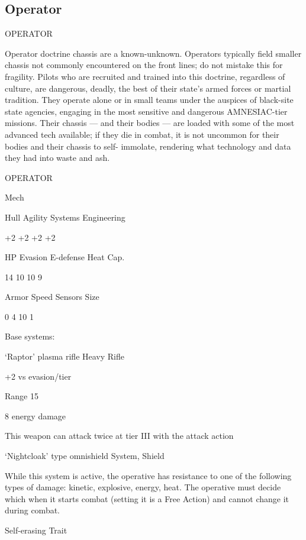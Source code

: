 \subsection{Operator}

                                              OPERATOR  

Operator doctrine chassis are a known-unknown. Operators typically field smaller chassis not  
commonly encountered on the front lines; do not mistake this for fragility. Pilots who are recruited  
and trained into this doctrine, regardless of culture, are dangerous, deadly, the best of their  
state’s armed forces or martial tradition. They operate alone or in small teams under the auspices  
of black-site state agencies, engaging in the most sensitive and dangerous AMNESIAC-tier  
missions. Their chassis — and their bodies — are loaded with some of the most advanced tech  
available; if they die in combat, it is not uncommon for their bodies and their chassis to self- 
immolate, rendering what technology and data they had into waste and ash. 
 

 OPERATOR 

 Mech 

 Hull       Agility      Systems       Engineering 

 +2         +2           +2            +2 

 HP         Evasion      E-defense     Heat Cap. 

 14         10           10            9 

 Armor      Speed        Sensors       Size 

 0          4            10            1 

Base systems:
 
‘Raptor’ plasma rifle  
Heavy Rifle
 
+2 vs evasion/tier
 
Range 15
 
8 energy damage
 
This weapon can attack twice at tier III with the attack action
 

‘Nightcloak’ type omnishield  
System, Shield
 
While this system is active, the operative has resistance to one of the following types of damage:  
kinetic, explosive, energy, heat. The operative must decide which when it starts combat (setting it  
is a Free Action) and cannot change it during combat.
 

Self-erasing  
Trait
 
